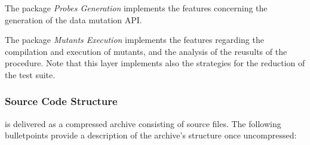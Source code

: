 The package \textit{Probes Generation} implements the features concerning the generation of the data mutation API.

The package \textit{Mutants Execution} implements the features regarding the compilation and execution of mutants, and the analysis of the reusults of the \dama procedure. Note that this layer implements also the strategies for the reduction of the test suite.

\subsubsection{Source Code Structure}


\dama is delivered as a compressed archive consisting of source files.
The following bulletpoints provide a description of the archive's structure once uncompressed:


